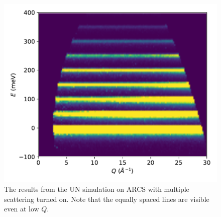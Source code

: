 \begin{figure}[h]
\centering
\includegraphics[width=\columnwidth]{figures/UN-ARCS-iqe.pdf}
\caption{The results from the UN simulation on ARCS with multiple scattering turned on.  Note that the equally spaced lines are visible even at low $Q$.}
\label{fig:UN_plot}
\end{figure}

